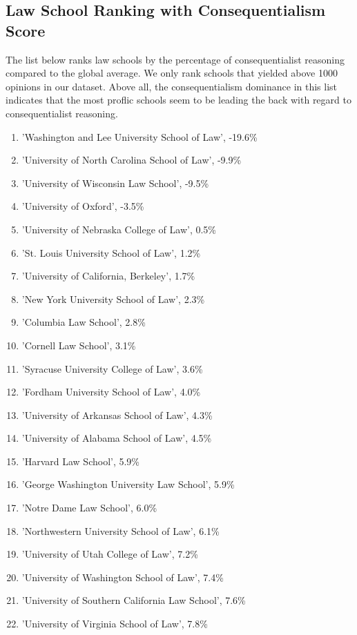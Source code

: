 \documentclass{article}
\begin{document}
\subsection{Law School Ranking with Consequentialism Score}
The list below ranks law schools by the percentage of consequentialist reasoning compared to the global average. We only rank schools that yielded above 1000 opinions in our dataset. Above all, the consequentialism dominance in this list indicates that the most proflic schools seem to be leading the back with regard to consequentialist reasoning.
\begin{enumerate}
    \item 'Washington and Lee University School of Law', -19.6\%
    \item 'University of North Carolina School of Law', -9.9\%
    \item 'University of Wisconsin Law School', -9.5\%
    \item 'University of Oxford', -3.5\%
    \item 'University of Nebraska College of Law', 0.5\%
    \item 'St. Louis University School of Law', 1.2\%
    \item 'University of California, Berkeley', 1.7\%
    \item 'New York University School of Law', 2.3\%
    \item 'Columbia Law School', 2.8\%
    \item 'Cornell Law School', 3.1\%
    \item 'Syracuse University College of Law', 3.6\%
    \item 'Fordham University School of Law', 4.0\%
    \item 'University of Arkansas School of Law', 4.3\%
    \item 'University of Alabama School of Law', 4.5\%
    \item 'Harvard Law School', 5.9\%
    \item 'George Washington University Law School', 5.9\%
    \item 'Notre Dame Law School', 6.0\%
    \item 'Northwestern University School of Law', 6.1\%
    \item 'University of Utah College of Law', 7.2\%
    \item 'University of Washington School of Law', 7.4\%
    \item 'University of Southern California Law School', 7.6\%
    \item 'University of Virginia School of Law', 7.8\%

\end{enumerate}
\end{document}
